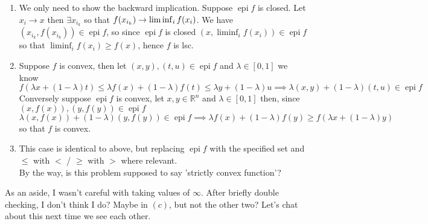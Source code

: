 \documentclass{article}
\newenvironment{ex}[1]
  {\renewcommand\theexercise{#1}\exercise}
  {\endexercise}
\DeclareMathOperator*{\epi}{epi}
\newcommand{\R}[1]{\mathbb{R}^{#1}}
\begin{document}
\begin{ex}{7.13} %
  \begin{enumerate}[label=(\alph*)] \, \\
    \item
      We only need to show the backward implication. Suppose $\epi f$ is closed. Let $x_i \to x$ then $\exists x_{i_k}$ so that $f(x_{i_k}) \to \liminf_{i} f(x_i)$. We have $(x_{i_k}, f(x_{i_k})) \in \epi f$, so since $\epi f$ is closed $(x, \liminf_{i} f(x_i)) \in \epi f$ so that $\liminf_{i} f(x_i) \ge f(x)$, hence $f$ is lsc.
    \item
      Suppose $f$ is convex, then let $(x, y), (t, u) \in \epi f$ and $\lambda \in [0, 1]$ we know
      $$
      f(\lambda x + (1-\lambda) t) \le \lambda f(x) + (1-\lambda)f(t) \le \lambda y + (1-\lambda) u \implies \lambda (x, y) + (1-\lambda) (t, u) \in \epi f
      $$
      Conversely suppose $\epi f$ is convex, let $x, y \in \R{n}$ and $\lambda \in [0, 1]$ then, since $(x, f(x)), (y, f(y)) \in \epi f$
      $$
      \lambda (x, f(x)) + (1-\lambda) (y, f(y)) \in \epi f \implies \lambda f(x) + (1-\lambda) f(y) \ge f(\lambda x + (1-\lambda) y)
      $$
      so that $f$ is convex.
    \item
      This case is identical to above, but replacing $\epi f$ with the specified set and $\le$ with $<$ / $\ge$ with $>$ where relevant. \, \\

      By the way, is this problem supposed to say 'strictly convex function'?
  \end{enumerate}
  As an aside, I wasn't careful with taking values of $\infty$. After briefly double checking, I don't think I do? Maybe in $(c)$, but not the other two? Let's chat about this next time we see each other.
\end{ex} %
\end{document}
